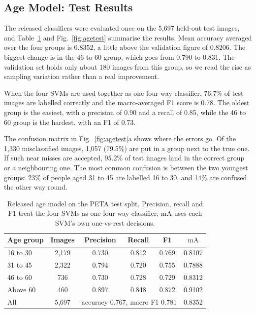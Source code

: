 \documentclass[conference]{IEEEtran}
\newcommand{\mA}{\mathrm{mA}}
\begin{document}
\subsection{Age Model: Test Results}
The released classifiers were evaluated once on the 5,697 held-out test images,
and Table~\ref{tab:age-test} and Fig.~\ref{fig:agetest} summarise the results.
Mean accuracy averaged over the four groups is 0.8352, a little above the
validation figure of 0.8206. The biggest change is in the 46 to 60 group, which
goes from 0.790 to 0.831. The validation set holds only about 180 images from this
group, so we read the rise as sampling variation rather than a real improvement.

When the four SVMs are used together as one four-way classifier, 76.7\% of test
images are labelled correctly and the macro-averaged F1 score is 0.78. The oldest
group is the easiest, with a precision of 0.90 and a recall of 0.85, while the 46
to 60 group is the hardest, with an F1 of 0.73.

The confusion matrix in Fig.~\ref{fig:agetest}a shows where the errors go. Of the
1,330 misclassified images, 1,057 (79.5\%) are put in a group next to the true
one. If such near misses are accepted, 95.2\% of test images land in the correct
group or a neighbouring one. The most common confusion is between the two youngest
groups: 23\% of people aged 31 to 45 are labelled 16 to 30, and 14\% are confused
the other way round.

\begin{table}[t]
\caption{Released age model on the PETA test split. Precision, recall and F1
treat the four SVMs as one four-way classifier; mA uses each SVM's own
one-vs-rest decisions.}
\label{tab:age-test}
\centering
\begin{tabular}{@{}lccccc@{}}
\toprule
Age group & Images & Precision & Recall & F1 & $\mA$ \\
\midrule
16 to 30 & 2,179 & 0.730 & 0.812 & 0.769 & 0.8107 \\
31 to 45 & 2,322 & 0.794 & 0.720 & 0.755 & 0.7888 \\
46 to 60 & 736   & 0.730 & 0.728 & 0.729 & 0.8312 \\
Above 60 & 460   & 0.897 & 0.848 & 0.872 & 0.9102 \\
\midrule
All      & 5,697 & \multicolumn{3}{c}{accuracy 0.767, macro F1 0.781} & 0.8352 \\
\bottomrule
\end{tabular}
\end{table}
\end{document}
